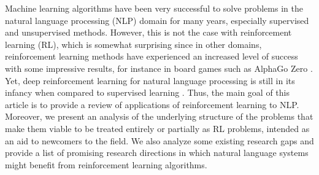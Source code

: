 

\label{intro}
Machine learning algorithms have been very successful to solve problems in the natural language processing (NLP) domain for many years, especially supervised and unsupervised methods. However, this is not the case with reinforcement learning (RL), which is somewhat surprising since in other domains, reinforcement learning methods have experienced an increased level of success with some impressive results, for instance in board games such as AlphaGo Zero . Yet, deep reinforcement learning for natural language processing is still in its infancy when compared to supervised learning . Thus, the main goal of this article is to provide a review of applications of reinforcement learning to NLP. Moreover, we present an analysis of the underlying structure of the problems that make them viable to be treated entirely or partially as RL problems, intended as an aid to newcomers to the field. We also analyze some existing research gaps and provide a list of promising research directions in which natural language systems might benefit from reinforcement learning algorithms.

